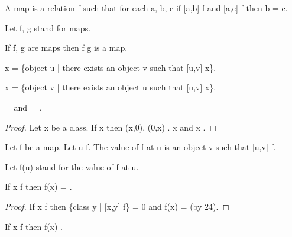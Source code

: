 \documentclass[a4paper,draft]{amsproc}
\begin{document}
\begin{forthel}
\begin{definition}[63]
A map is a relation f such that for each a, b, c
if [a,b] \in f and [a,c] \in f then b = c.
\end{definition}

Let f, g stand for maps.

\begin{theorem}[64]
If f, g are maps then f \circ g is a map.
\end{theorem}

\begin{definition}[65]
\domain x = \{object u |  there exists an object v such that [u,v] \in x\}.
\end{definition}

\begin{definition}[66]
\range x = \{object v |  there exists an object u such that [u,v] \in x\}.
\end{definition}

\begin{theorem}[67]
\domain {} =  and \range {} = .
\end{theorem}
\begin{proof}
Let x be a class.
If x \in {} then (x,0), (0,x) \in {}.
x \in \domain {} and x \in \range {}.
\end{proof}

\begin{signature}[68]
Let f be a map. Let u \in \domain f.
The value of f at u is an object v such that [u,v] \in f.
\end{signature}
Let f(u) stand for the value of f at u.


\begin{theorem}[69a]
If x \notin \domain f then f(x) = .
\end{theorem}
\begin{proof}
If x \notin \domain f 
then \{class y | [x,y] \in f\} = 0 and f(x) =  (by 24).
\end{proof}

\begin{theorem}[69b]
If x \in \domain f then f(x) \in {}.
\end{theorem}


\end{forthel}
\end{document}
